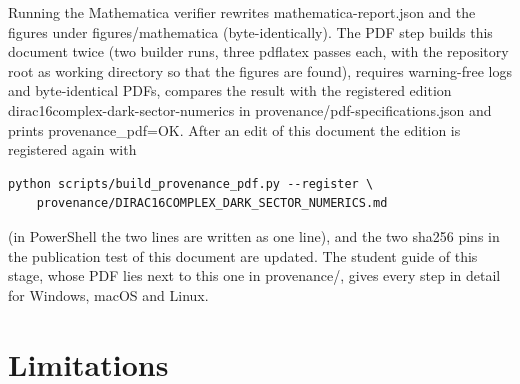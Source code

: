 \documentclass[11pt]{article}
\begin{document}
Running the Mathematica verifier rewrites mathematica-report.json and the figures under figures/mathematica (byte-identically). The PDF step builds this document twice (two builder runs, three pdflatex passes each, with the repository root as working directory so that the figures are found), requires warning-free logs and byte-identical PDFs, compares the result with the registered edition dirac16complex-dark-sector-numerics in provenance/pdf-specifications.json and prints provenance\_pdf=OK. After an edit of this document the edition is registered again with

\begin{Verbatim}[fontsize=\small]
python scripts/build_provenance_pdf.py --register \
    provenance/DIRAC16COMPLEX_DARK_SECTOR_NUMERICS.md
\end{Verbatim}

(in PowerShell the two lines are written as one line), and the two sha256 pins in the publication test of this document are updated. The student guide of this stage, whose PDF lies next to this one in provenance/, gives every step in detail for Windows, macOS and Linux.

\section{Limitations}
\end{document}
